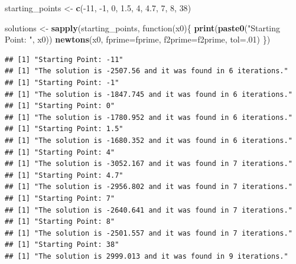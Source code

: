 \documentclass[]{article}
\newenvironment{Shaded}{\begin{snugshade}}{\end{snugshade}}
\newcommand{\KeywordTok}[1]{\textcolor[rgb]{0.13,0.29,0.53}{\textbf{{#1}}}}
\newcommand{\DataTypeTok}[1]{\textcolor[rgb]{0.13,0.29,0.53}{{#1}}}
\newcommand{\DecValTok}[1]{\textcolor[rgb]{0.00,0.00,0.81}{{#1}}}
\newcommand{\FloatTok}[1]{\textcolor[rgb]{0.00,0.00,0.81}{{#1}}}
\newcommand{\CharTok}[1]{\textcolor[rgb]{0.31,0.60,0.02}{{#1}}}
\newcommand{\StringTok}[1]{\textcolor[rgb]{0.31,0.60,0.02}{{#1}}}
\newcommand{\NormalTok}[1]{{#1}}
\begin{document}
\begin{Shaded}
\begin{Highlighting}[]
\NormalTok{starting_points <-}\StringTok{ }\KeywordTok{c}\NormalTok{(-}\DecValTok{11}\NormalTok{, -}\DecValTok{1}\NormalTok{, }\DecValTok{0}\NormalTok{, }\FloatTok{1.5}\NormalTok{, }\DecValTok{4}\NormalTok{, }\FloatTok{4.7}\NormalTok{, }\DecValTok{7}\NormalTok{, }\DecValTok{8}\NormalTok{, }\DecValTok{38}\NormalTok{)}

\NormalTok{solutions <-}\StringTok{ }\KeywordTok{sapply}\NormalTok{(starting_points, function(x0)\{}
  \KeywordTok{print}\NormalTok{(}\KeywordTok{paste0}\NormalTok{(}\StringTok{"Starting Point: "}\NormalTok{, x0))}
  \KeywordTok{newtons}\NormalTok{(x0, }\DataTypeTok{fprime=}\NormalTok{fprime, }\DataTypeTok{f2prime=}\NormalTok{f2prime, }\DataTypeTok{tol=}\NormalTok{.}\DecValTok{01}\NormalTok{)}
\NormalTok{\})}
\end{Highlighting}
\end{Shaded}

\begin{verbatim}
## [1] "Starting Point: -11"
## [1] "The solution is -2507.56 and it was found in 6 iterations."
## [1] "Starting Point: -1"
## [1] "The solution is -1847.745 and it was found in 6 iterations."
## [1] "Starting Point: 0"
## [1] "The solution is -1780.952 and it was found in 6 iterations."
## [1] "Starting Point: 1.5"
## [1] "The solution is -1680.352 and it was found in 6 iterations."
## [1] "Starting Point: 4"
## [1] "The solution is -3052.167 and it was found in 7 iterations."
## [1] "Starting Point: 4.7"
## [1] "The solution is -2956.802 and it was found in 7 iterations."
## [1] "Starting Point: 7"
## [1] "The solution is -2640.641 and it was found in 7 iterations."
## [1] "Starting Point: 8"
## [1] "The solution is -2501.557 and it was found in 7 iterations."
## [1] "Starting Point: 38"
## [1] "The solution is 2999.013 and it was found in 9 iterations."
\end{verbatim}

\begin{Shaded}
\end{Shaded}
\end{document}
